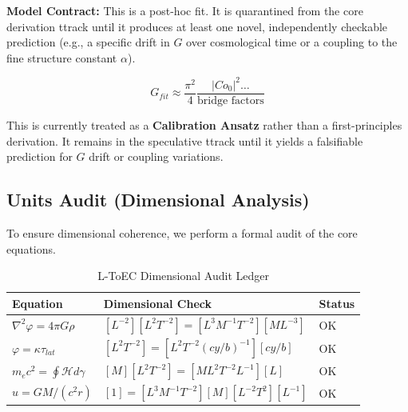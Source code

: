 \documentclass[11pt,titlepage]{article}
\begin{document}
\textbf{Model Contract:} This is a post-hoc fit. It is quarantined from the core derivation ttrack until it produces at least one novel, independently checkable prediction (e.g., a specific drift in $G$ over cosmological time or a coupling to the fine structure constant $\alpha$).

\begin{equation}
G_{fit} \approx \frac{\pi^2}{4} \frac{|Co_0|^2 \dots}{\text{bridge factors}}
\end{equation}

This is currently treated as a \textbf{Calibration Ansatz} rather than a first-principles derivation. It remains in the speculative ttrack until it yields a falsifiable prediction for $G$ drift or coupling variations.

\subsection{Units Audit (Dimensional Analysis)}
\label{sec:units_audit}
To ensure dimensional coherence, we perform a formal audit of the core equations.

\begin{table}[h!]
\centering
\begin{tabular}{@{}lll@{}}
\toprule
\textbf{Equation} & \textbf{Dimensional Check} & \textbf{Status} \\ \midrule
$\nabla^2 \varphi = 4\pi G \rho$ & $[L^{-2}][L^2 T^{-2}] = [L^3 M^{-1} T^{-2}][M L^{-3}]$ & OK \\
$\varphi = \kappa \tau_{lat}$ & $[L^2 T^{-2}] = [L^2 T^{-2} (cy/b)^{-1}][cy/b]$ & OK \\
$m_e c^2 = \oint \mathcal{H} d\gamma$ & $[M][L^2 T^{-2}] = [M L^2 T^{-2} L^{-1}][L]$ & OK \\
$u = GM/(c^2 r)$ & $[1] = [L^3 M^{-1} T^{-2}][M][L^{-2} T^2][L^{-1}]$ & OK \\ \bottomrule
\end{tabular}
\caption{L-ToEC Dimensional Audit Ledger}
\end{table}
\end{document}
